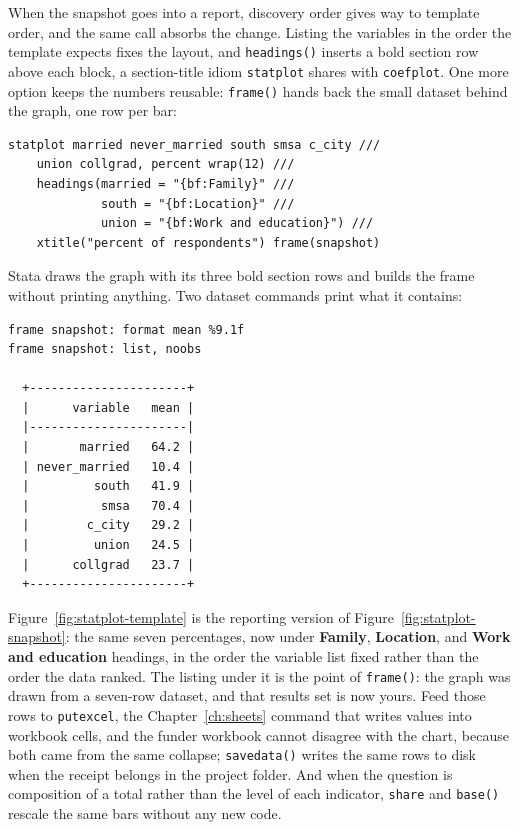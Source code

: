 When the snapshot goes into a report, discovery order gives way to template order, and the same call absorbs the change. Listing the variables in the order the template expects fixes the layout, and \texttt{headings()} inserts a bold section row above each block, a section-title idiom \texttt{statplot} shares with \texttt{coefplot}. One more option keeps the numbers reusable: \texttt{frame()} hands back the small dataset behind the graph, one row per bar:
\par
{\footnotesize
\begin{verbatim}
statplot married never_married south smsa c_city ///
    union collgrad, percent wrap(12) ///
    headings(married = "{bf:Family}" ///
             south = "{bf:Location}" ///
             union = "{bf:Work and education}") ///
    xtitle("percent of respondents") frame(snapshot)
\end{verbatim}
}
Stata draws the graph with its three bold section rows and builds the frame without printing anything. Two dataset commands print what it contains:
\par
{\footnotesize
\begin{verbatim}
frame snapshot: format mean %9.1f
frame snapshot: list, noobs

  +----------------------+
  |      variable   mean |
  |----------------------|
  |       married   64.2 |
  | never_married   10.4 |
  |         south   41.9 |
  |          smsa   70.4 |
  |        c_city   29.2 |
  |         union   24.5 |
  |      collgrad   23.7 |
  +----------------------+
\end{verbatim}
}
Figure~\ref{fig:statplot-template} is the reporting version of Figure~\ref{fig:statplot-snapshot}: the same seven percentages, now under \textbf{Family}, \textbf{Location}, and \textbf{Work and education} headings, in the order the variable list fixed rather than the order the data ranked. The listing under it is the point of \texttt{frame()}: the graph was drawn from a seven-row dataset, and that results set is now yours. Feed those rows to \texttt{putexcel}, the Chapter~\ref{ch:sheets} command that writes values into workbook cells, and the funder workbook cannot disagree with the chart, because both came from the same collapse; \texttt{savedata()} writes the same rows to disk when the receipt belongs in the project folder. And when the question is composition of a total rather than the level of each indicator, \texttt{share} and \texttt{base()} rescale the same bars without any new code.

